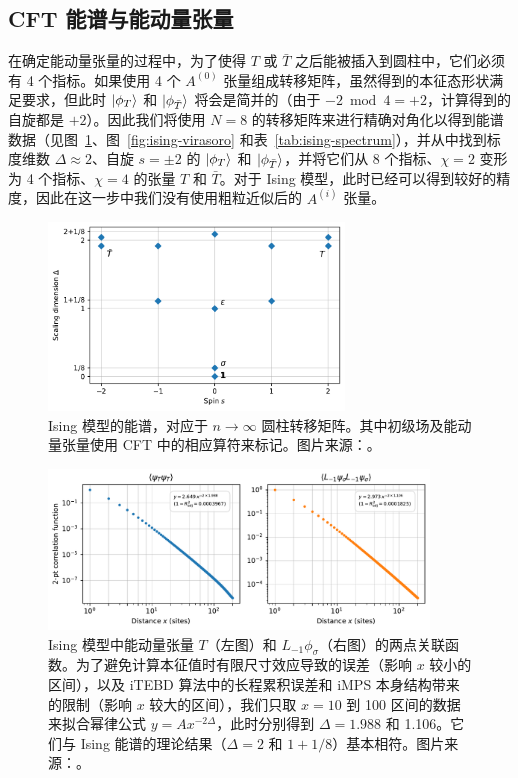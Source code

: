 \subsection{CFT 能谱与能动量张量}

在确定能动量张量的过程中，为了使得 $T$ 或 $\bar{T}$ 之后能被插入到圆柱中，它们必须有 4 个指标。如果使用 4 个 $A^{(0)}$ 张量组成转移矩阵，虽然得到的本征态形状满足要求，但此时 $\ket*{\phi_T}$ 和 $\ket*{\phi_{\bar{T}}}$ 将会是简并的（由于 $-2\bmod4=+2$，计算得到的自旋都是 $+2$）。因此我们将使用 $N=8$ 的转移矩阵来进行精确对角化以得到能谱数据（见图~\ref{fig:ising-spectrum}、图~\ref{fig:ising-virasoro} 和表~\ref{tab:ising-spectrum}），并从中找到标度维数 $\Delta\approx2$、自旋 $s=\pm2$ 的 $\ket*{\phi_T}$ 和 $\ket*{\phi_{\bar{T}}}$，并将它们从 8 个指标、$\chi=2$ 变形为 4 个指标、$\chi=4$ 的张量 $T$ 和 $\bar{T}$。对于 Ising 模型，此时已经可以得到较好的精度，因此在这一步中我们没有使用粗粒近似后的 $A^{(i)}$ 张量。

\begin{figure}[ht]
  \centering
  \includegraphics[width=0.7\textwidth]{images/fibonacci/ising-spectrum.pdf}
  \caption[Ising 模型的能谱]{Ising 模型的能谱，对应于 $n\to\infty$ 圆柱转移矩阵。其中初级场及能动量张量使用 CFT 中的相应算符来标记。图片来源：\parencite{zeng2023virasoro}。}
  \label{fig:ising-spectrum}
\end{figure}

\begin{figure}[ht]
  \centering
  \includegraphics[width=0.9\textwidth]{images/fibonacci/ising-correlation-function.pdf}
  \caption[Ising 模型中的两点关联函数]{Ising 模型中能动量张量 $T$（左图）和 $L_{-1}\phi_\sigma$（右图）的两点关联函数。为了避免计算本征值时有限尺寸效应导致的误差（影响 $x$ 较小的区间），以及 iTEBD 算法中的长程累积误差和 iMPS 本身结构带来的限制（影响 $x$ 较大的区间），我们只取 $x=10$ 到 100 区间的数据来拟合幂律公式 $y=Ax^{-2\Delta}$，此时分别得到 $\Delta=1.988$ 和 1.106。它们与 Ising 能谱的理论结果（$\Delta=2$ 和 $1+1/8$）基本相符。图片来源：\parencite{zeng2023virasoro}。}
  \label{fig:ising-correlation-functions}
\end{figure}

